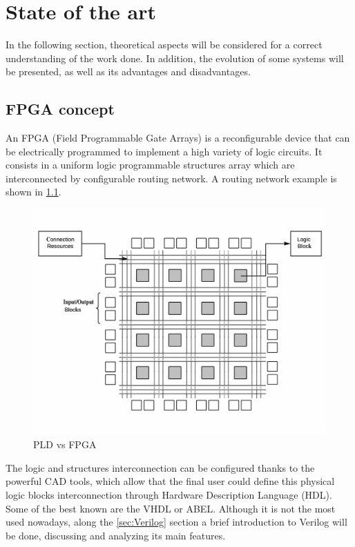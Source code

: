 \chapter{State of the art}\label{sec:Estado_arte}
In the following section, theoretical aspects will be considered for a correct understanding of the work done. In addition, the evolution of some systems will be presented, as well as its advantages and disadvantages.
\section{FPGA concept}
An FPGA\cite{FPGAWhat} (Field Programmable Gate Arrays) is a reconfigurable device that can be electrically programmed to implement a high variety of logic circuits. It consists in a uniform logic programmable structures array which are interconnected by configurable routing network. A routing network example is shown in \ref{fig:estructura_FPGA}.

\begin{center}
	\begin{figure}[H]
		\center
		\includegraphics[trim = 0mm 10mm 0mm 10mm, clip,scale=0.4]{imagenes/EstadoArte/estructura_FPGA.pdf}
		\caption{PLD vs FPGA}
		\label{fig:estructura_FPGA}
	\end{figure}
\end{center}

The logic and structures interconnection can be configured thanks to the powerful CAD tools, which allow that the final user could define this physical logic blocks interconnection through Hardware Description Language (HDL). Some of the best known are the VHDL or ABEL. Although it is not the most used nowadays, along the \ref{sec:Verilog} section a brief introduction to Verilog will be done, discussing and analyzing its main features.
